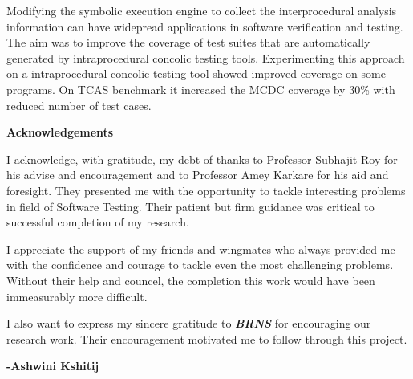 \documentclass[12pt,oneside]{book}
\begin{document}
\vspace {0.5 cm}

Modifying the symbolic execution engine to collect the interprocedural analysis information can have widepread applications in software verification and testing. The aim was to improve the coverage of test suites that are automatically generated by intraprocedural concolic testing tools. Experimenting this approach on a intraprocedural concolic testing tool\cite{concolicEngine} showed improved coverage on some programs. On TCAS benchmark\cite{tcas} it increased the MCDC\cite{mcdc} coverage by 30\% with reduced number of test cases.    




\newpage

\begin{center}
\textbf{\Large{Acknowledgements}}
\end{center}

\vspace{1.0 cm}

I acknowledge, with gratitude, my debt of thanks to Professor Subhajit Roy for his advise and encouragement and to Professor Amey Karkare for his aid and foresight. They presented me with the opportunity to tackle interesting problems in field of Software Testing. Their patient but firm guidance was critical to successful completion of my research.  

\vspace{0.5 cm}

I appreciate the support of my friends and wingmates who always provided me with the confidence and courage to tackle even the most challenging problems. Without their help and councel, the completion this work would have been immeasurably more difficult. 

\vspace{1.0 cm}

I also want to express my sincere gratitude to \textit {\textbf {BRNS}} for encouraging our research work. Their encouragement motivated me to follow through this project.

\begin{flushright}
\textbf{-Ashwini Kshitij}
\end{flushright}

\newpage


\tableofcontents
\listoffigures
\listoftables
\end{document}
